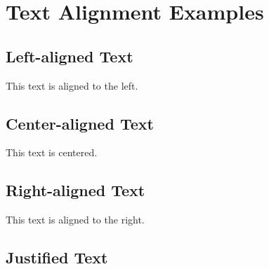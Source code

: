 \documentclass{article}
\begin{document}
\section{Text Alignment Examples}

\subsection{Left-aligned Text}
\begin{flushleft}
    This text is aligned to the left.
\end{flushleft}

\subsection{Center-aligned Text}
\begin{center}
    This text is centered.
\end{center}

\subsection{Right-aligned Text}
\begin{flushright}
    This text is aligned to the right.
\end{flushright}

\subsection{Justified Text}
\lipsum[1] %
\end{document}
